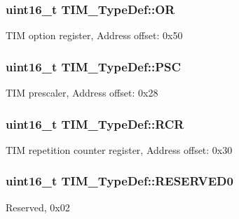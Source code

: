 \subsubsection[{\texorpdfstring{OR}{OR}}]{ uint16\+\_\+t T\+I\+M\+\_\+\+Type\+Def\+::\+OR}\hypertarget{struct_t_i_m___type_def_a145760563b46fcdeedddf7c92ee68d61}{}\label{struct_t_i_m___type_def_a145760563b46fcdeedddf7c92ee68d61}
T\+IM option register, Address offset\+: 0x50 
\subsubsection[{\texorpdfstring{P\+SC}{PSC}}]{ uint16\+\_\+t T\+I\+M\+\_\+\+Type\+Def\+::\+P\+SC}\hypertarget{struct_t_i_m___type_def_ad58e05db30d309608402a69d87c36505}{}\label{struct_t_i_m___type_def_ad58e05db30d309608402a69d87c36505}
T\+IM prescaler, Address offset\+: 0x28 
\subsubsection[{\texorpdfstring{R\+CR}{RCR}}]{ uint16\+\_\+t T\+I\+M\+\_\+\+Type\+Def\+::\+R\+CR}\hypertarget{struct_t_i_m___type_def_aa6957ece6ee709031ab5241d6019fcce}{}\label{struct_t_i_m___type_def_aa6957ece6ee709031ab5241d6019fcce}
T\+IM repetition counter register, Address offset\+: 0x30 
\subsubsection[{\texorpdfstring{R\+E\+S\+E\+R\+V\+E\+D0}{RESERVED0}}]{\setlength{\rightskip}{0pt plus 5cm}uint16\+\_\+t T\+I\+M\+\_\+\+Type\+Def\+::\+R\+E\+S\+E\+R\+V\+E\+D0}\hypertarget{struct_t_i_m___type_def_a88caad1e82960cc6df99d935ece26c1b}{}\label{struct_t_i_m___type_def_a88caad1e82960cc6df99d935ece26c1b}
Reserved, 0x02 
